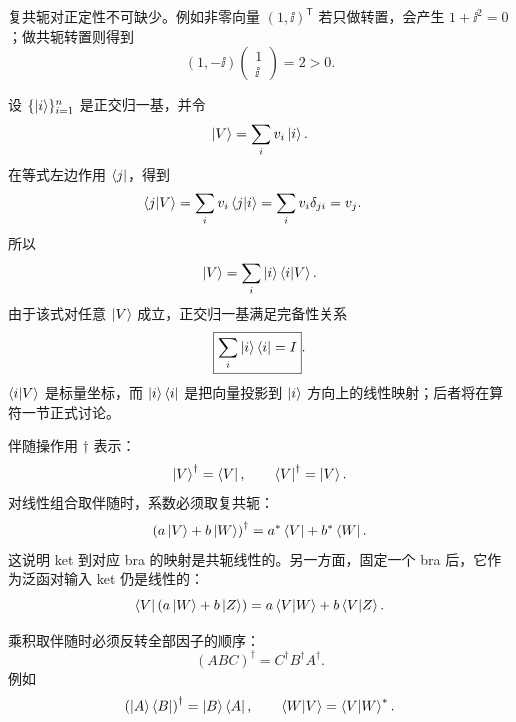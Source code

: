 复共轭对正定性不可缺少。例如非零向量 $(1,\ii)^{\mathsf T}$ 若只做转置，会产生 $1+\ii^2=0$；做共轭转置则得到
\[
  (1,-\ii)\begin{pmatrix}1\\\ii\end{pmatrix}=2>0.
\]


设 $\{\left|i\right\rangle\}_{i=1}^{n}$ 是正交归一基，并令
\[
  \left|V\right\rangle=\sum_i v_i\left|i\right\rangle.
\]
在等式左边作用 $\left\langle j\right|$，得到
\begin{align}
  \left\langle j \middle| V \right\rangle
  &=\sum_i v_i\left\langle j \middle| i \right\rangle
    =\sum_i v_i\delta_{ji}
    =v_j.
  \label{eq:QM-C01-S03-orthonormal-coordinate}
\end{align}
所以
\begin{equation}
  \left|V\right\rangle=\sum_i\left|i\right\rangle\left\langle i \middle| V \right\rangle.
  \label{eq:QM-C01-S03-orthonormal-expansion}
\end{equation}
由于该式对任意 $\left|V\right\rangle$ 成立，正交归一基满足完备性关系
\begin{equation}
  \boxed{\sum_i\left|i\right\rangle\left\langle i\right|=I}.
  \label{eq:QM-C01-S03-completeness}
\end{equation}
$\left\langle i \middle| V \right\rangle$ 是标量坐标，而 $\left|i\right\rangle\left\langle i\right|$ 是把向量投影到 $\left|i\right\rangle$ 方向上的线性映射；后者将在算符一节正式讨论。



伴随操作用 $\dagger$ 表示：
\[
  \left|V\right\rangle^{\dagger}=\left\langle V\right|,
  \qquad
  \left\langle V\right|^{\dagger}=\left|V\right\rangle.
\]
对线性组合取伴随时，系数必须取复共轭：
\begin{equation}
  \left(a\left|V\right\rangle+b\left|W\right\rangle\right)^{\dagger}
  =a^*\left\langle V\right|+b^*\left\langle W\right|.
  \label{eq:QM-C01-S03-adjoint-linear-combination}
\end{equation}
这说明 ket 到对应 bra 的映射是共轭线性的。另一方面，固定一个 bra 后，它作为泛函对输入 ket 仍是线性的：
\[
  \left\langle V\right|\left(a\left|W\right\rangle+b\left|Z\right\rangle\right)
  =a\left\langle V \middle| W \right\rangle+b\left\langle V \middle| Z \right\rangle.
\]

乘积取伴随时必须反转全部因子的顺序：
\begin{equation}
  (ABC)^{\dagger}=C^{\dagger}B^{\dagger}A^{\dagger}.
  \label{eq:QM-C01-S03-adjoint-product}
\end{equation}
例如
\[
  \left(\left|A\right\rangle\left\langle B\right|\right)^{\dagger}=\left|B\right\rangle\left\langle A\right|,
  \qquad
  \left\langle W \middle| V \right\rangle=\left\langle V \middle| W \right\rangle^{*}.
\]

